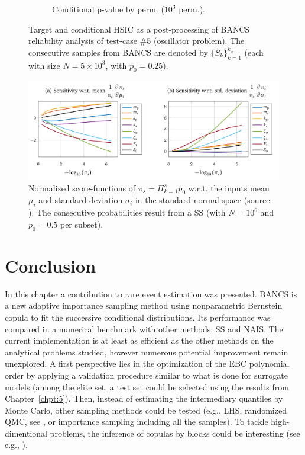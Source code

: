 \begin{figure}
\begin{subfigure}[b]{0.48\linewidth}
        \caption{Conditional p-value by perm. ($10^3$ perm.).}
    \end{subfigure}
    \caption{Target and conditional HSIC as a post-processing of BANCS reliability analysis of test-case \#5 (oscillator problem). 
    The consecutive samples from BANCS are denoted by $\{S_k\}_{k=1}^{k_\#}$ (each with size $N=5\times10^3$, with $p_0=0.25$).}
    \label{fig:rosa_oscillator}
\end{figure}


\begin{figure}
    \centering
    \includegraphics[width=0.9\linewidth]{part3/figures/BANCS/score_function_HDR_JMB.png}
    \caption{Normalized score-functions of $\pi_s = \Pi_{k=1}^s p_0$ w.r.t. the inputs mean $\mu_i$ and standard deviation $\sigma_i$ in the standard normal space (source: \citealp[p.54]{bourinet_2018}). 
            The consecutive probabilities result from a SS (with $N=10^6$ and $p_0=0.5$ per subset).}
    \label{fig:score_functions_oscillator}
\end{figure}



\section{Conclusion}

In this chapter a contribution to rare event estimation was presented. 
BANCS is a new adaptive importance sampling method using nonparametric Bernstein copula to fit the successive conditional distributions. 
Its performance was compared in a numerical benchmark with other methods: SS and NAIS. 
The current implementation is at least as efficient as the other methods on the analytical problems studied, however numerous potential improvement remain unexplored. 
A first perspective lies in the optimization of the EBC polynomial order by applying a validation procedure similar to what is done for surrogate models (among the elite set, a test set could be selected using the results from Chapter~\ref{chpt:5}). 
Then, instead of estimating the intermediary quantiles by Monte Carlo, other sampling methods could be tested (e.g., LHS, randomized QMC, see \citealp{tuffin_2019}, or importance sampling including all the samples). 
To tackle high-dimentional problems, the inference of copulas by blocks could be interesting (see e.g., \citealp{lasserre_2022}).

